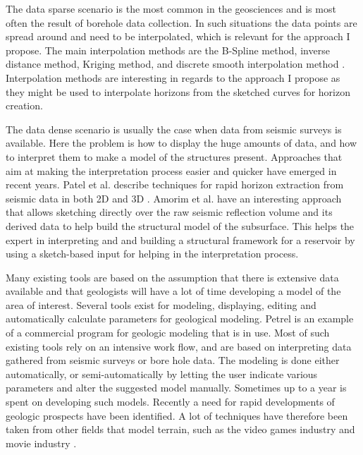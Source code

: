 \documentclass[a4paper,12pt]{report}
\begin{document}
The data sparse scenario is the most common in the geosciences and is most often the result of borehole data collection. In such situations the data points are spread around and need to be interpolated, which is relevant for the approach I propose. The main interpolation methods are the B-Spline method, inverse distance method, Kriging method, and discrete smooth interpolation method \cite{mallet1992discrete, mallet1997discrete}. Interpolation methods are interesting in regards to the approach I propose as they might be used to interpolate horizons from the sketched curves for horizon creation. 

The data dense scenario is usually the case when data from seismic surveys is available. Here the problem is how to display the huge amounts of data, and how to interpret them to make a model of the structures present. Approaches that aim at making the interpretation process easier and quicker have emerged in recent years. Patel et al. describe techniques for rapid horizon extraction from seismic data in both 2D \cite{patel2008seismic} and 3D \cite{patel2010seismic}. Amorim et al. \cite{amorim2012sketch} have an interesting approach that allows sketching directly over the raw seismic reflection volume and its derived data to help build the structural model of the subsurface. This helps the expert in interpreting and and building a structural framework for a reservoir by using a sketch-based input for helping in the interpretation process.

Many existing tools are based on the assumption that there is extensive data available and that geologists will have a lot of time developing a model of the area of interest. Several tools exist for modeling, displaying, editing and automatically calculate parameters for geological modeling.  Petrel \cite{petrel} is an example of a commercial program for geologic modeling that is in use. Most of such existing tools rely on an intensive work flow, and are based on interpreting data gathered from seismic surveys or bore hole data. The modeling is done either automatically, or semi-automatically by letting the user indicate various parameters and alter the suggested model manually. Sometimes up to a year is spent on developing such models. Recently a need for rapid developments of geologic prospects have been identified. A lot of techniques have therefore been taken from other fields that model terrain, such as the video games industry and movie industry \cite{natali2013modeling}.
\end{document}

